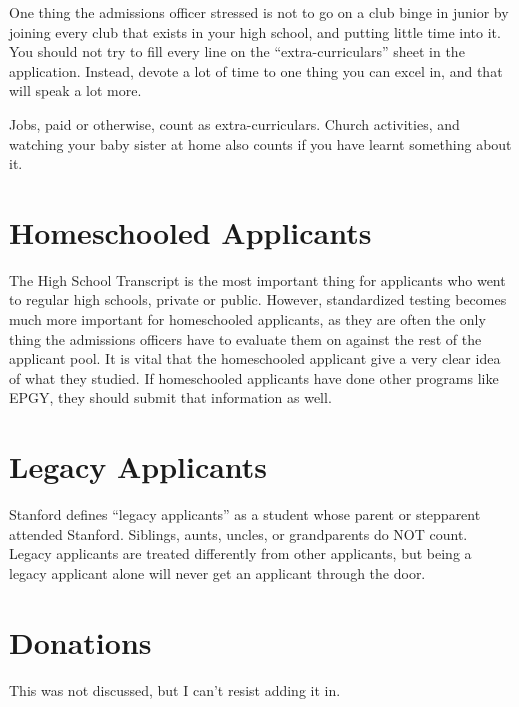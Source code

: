 \documentclass[12pt]{article}
\begin{document}
One thing the admissions officer stressed is not to go on a club binge
in junior by joining every club that exists in your high school,
and putting little time into it. You should not try to
fill every line on the ``extra-curriculars'' sheet in the application.
Instead, devote a lot of time to one thing you can excel in, and that
will speak a lot more. 

Jobs, paid or otherwise, count as extra-curriculars. Church activities,
and watching your baby sister at home also counts if you have learnt
something about it. 


\section{Homeschooled Applicants}

The High School Transcript is the most important thing for applicants
who went to regular high schools, private or public.
However, standardized testing becomes much more important for homeschooled
applicants, as they are often the only thing the admissions officers have
to evaluate them on against the rest of the applicant pool.
It is vital that the homeschooled applicant give a very clear idea of what
they studied. 
If homeschooled applicants have done other programs like EPGY,
they should submit that information as well. 


\section{Legacy Applicants}

Stanford defines ``legacy applicants''
as a student whose parent or stepparent attended Stanford.
Siblings, aunts, uncles, or grandparents do NOT count. 
Legacy applicants are treated differently from other applicants,
but being a legacy applicant alone will never get an applicant through the door. 


\section{Donations}

This was not discussed, but I can't resist adding it in.
\end{document}
